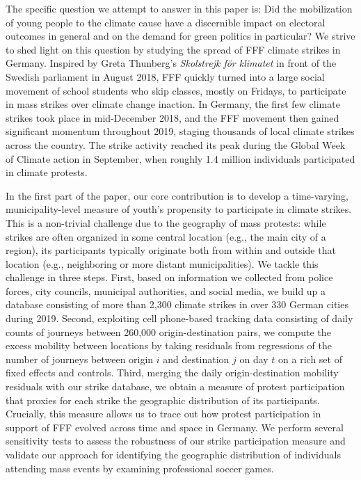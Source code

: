 The specific question we attempt to answer in this paper is: Did the mobilization of young people to the climate cause have a discernible impact on electoral outcomes in general and on the demand for green politics in particular? We strive to shed light on this question by studying the spread of FFF climate strikes in Germany. Inspired by Greta Thunberg's \emph{Skolstrejk för klimatet} in front of the Swedish parliament in August 2018, FFF quickly turned into a large social movement of school students who skip classes, mostly on Fridays, to participate in mass strikes over climate change inaction. In Germany, the first few climate strikes took place in mid-December 2018, and the FFF movement then gained significant momentum throughout 2019, staging thousands of local climate strikes across the country. The strike activity reached its peak during the Global Week of Climate action in September, when roughly 1.4 million individuals participated in climate protests.

In the first part of the paper, our core contribution is to develop a time-varying, municipality-level measure of youth's propensity to participate in climate strikes. This is a non-trivial challenge due to the geography of mass protests: while strikes are often organized in some central location (e.g., the main city of a region), its participants typically originate both from within and outside that location (e.g., neighboring or more distant municipalities). We tackle this challenge in three steps. First, based on information we collected from police forces, city councils, municipal authorities, and social media, we build up a database consisting of more than 2,300 climate strikes in over 330 German cities during 2019. Second, exploiting cell phone-based tracking data consisting of daily counts of journeys between 260,000 origin-destination pairs, we compute the excess mobility between locations by taking residuals from regressions of the number of journeys between origin $i$ and destination $j$ on day $t$ on a rich set of fixed effects and controls. Third, merging the daily origin-destination mobility residuals with our strike database, we obtain a measure of protest participation that proxies for each strike the geographic distribution of its participants. Crucially, this measure allows us to trace out how protest participation in support of FFF evolved across time and space in Germany. We perform several sensitivity tests to assess the robustness of our strike participation measure and validate our approach for identifying the geographic distribution of individuals attending mass events by examining professional soccer games.


